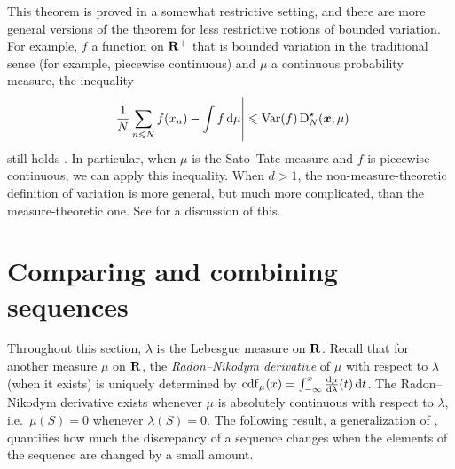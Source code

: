 This theorem is proved in a somewhat restrictive setting, and there are more 
general versions of the theorem for less restrictive notions of bounded 
variation. For example,  $f$ a function on $\mathbf{R}^+$ that is bounded variation 
in the traditional sense (for example, piecewise continuous) and $\mu$ a 
continuous probability measure, the inequality 
\[
	\left| \frac{1}{N} \sum_{n\leqslant N} f(x_n) - \int f\, \mathrm{d}\mu\right| \leqslant \operatorname{Var}(f) \operatorname{D}_N^\star({\boldsymbol x},\mu) 
\]
still holds \cite[Ch.~2, Th.~5.1]{kuipers-niederreiter-1974}. In particular, 
when $\mu$ is the Sato--Tate measure and $f$ is piecewise continuous, we can 
apply this inequality. When $d>1$, the non-measure-theoretic definition of 
variation is more general, but much more complicated, than the 
measure-theoretic one. See \cite[2\S5]{kuipers-niederreiter-1974} for a 
discussion of this. 





\section{Comparing and combining sequences}

Throughout this section, $\lambda$ is the Lebesgue measure on $\mathbf{R}$. Recall 
that for another measure $\mu$ on $\mathbf{R}$, the \emph{Radon--Nikodym derivative} 
of $\mu$ with respect to $\lambda$ (when it exists) is uniquely determined by 
$\operatorname{cdf}_\mu(x) = \int_{-\infty}^x \frac{\mathrm{d}\mu}{\mathrm{d}\lambda}(t)\, \mathrm{d} t$. The 
Radon--Nikodym derivative exists whenever $\mu$ is absolutely continuous with 
respect to $\lambda$, i.e.~$\mu(S) = 0$ whenever $\lambda(S) = 0$. The 
following result, a generalization of 
\cite[Ch.~2 Th.~4.1]{kuipers-niederreiter-1974}, quantifies how much the 
discrepancy of a sequence changes when the elements of the sequence are changed 
by a small amount. 

